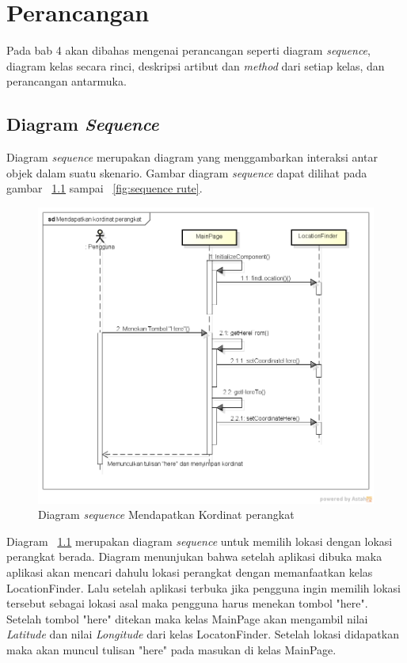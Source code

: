 \chapter{Perancangan}
\label{chap:Perancangan}

Pada bab 4 akan dibahas mengenai perancangan seperti diagram \textit{sequence}, diagram kelas secara rinci, deskripsi artibut dan \textit{method} dari setiap kelas, dan perancangan antarmuka.

\section{Diagram \textit{Sequence}}
\label{lab:Diagram Sequence}
\hspace{0.5cm} Diagram \textit{sequence} merupakan diagram yang menggambarkan interaksi antar objek dalam suatu skenario. Gambar diagram \textit{sequence} dapat dilihat pada gambar ~\ref{fig:sequence lokasi perangkat} sampai ~\ref{fig:sequence rute}. 

\begin{figure}[h]
	\centering
		\includegraphics[scale=0.4]{Gambar/sequence/MendapatkanKordinatPerangkat}
	\caption{Diagram \textit{sequence} Mendapatkan Kordinat perangkat}
	\label{fig:sequence lokasi perangkat}
\end{figure}

\hspace{0.5cm} Diagram ~\ref{fig:sequence lokasi perangkat} merupakan diagram \textit{sequence} untuk memilih lokasi dengan lokasi perangkat berada. Diagram menunjukan bahwa setelah aplikasi dibuka maka aplikasi akan mencari dahulu lokasi perangkat dengan memanfaatkan kelas LocationFinder. Lalu setelah aplikasi terbuka jika pengguna ingin memilih lokasi tersebut sebagai lokasi asal maka pengguna harus menekan tombol "here". Setelah tombol "here" ditekan maka kelas MainPage akan mengambil nilai \textit{Latitude} dan nilai \textit{Longitude} dari kelas LocatonFinder. Setelah lokasi didapatkan maka akan muncul tulisan "here" pada masukan di kelas MainPage.

